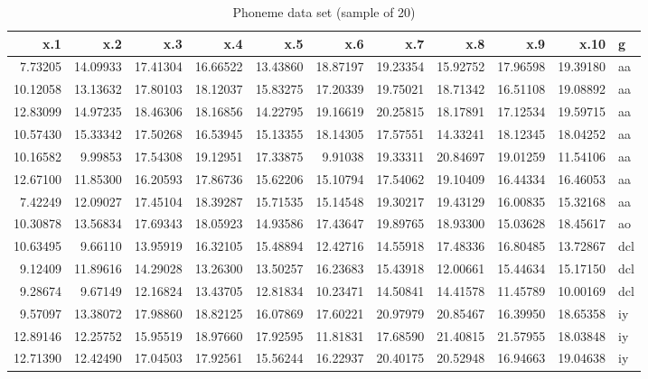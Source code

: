 \documentclass[
]{article}
\begin{document}
\begin{table}

\caption{\label{tab:unnamed-chunk-11}Phoneme data set (sample of 20)}
\centering
\begin{tabular}[t]{r|r|r|r|r|r|r|r|r|r|l}
\hline
x.1 & x.2 & x.3 & x.4 & x.5 & x.6 & x.7 & x.8 & x.9 & x.10 & g\\
\hline
7.73205 & 14.09933 & 17.41304 & 16.66522 & 13.43860 & 18.87197 & 19.23354 & 15.92752 & 17.96598 & 19.39180 & aa\\
\hline
10.12058 & 13.13632 & 17.80103 & 18.12037 & 15.83275 & 17.20339 & 19.75021 & 18.71342 & 16.51108 & 19.08892 & aa\\
\hline
12.83099 & 14.97235 & 18.46306 & 18.16856 & 14.22795 & 19.16619 & 20.25815 & 18.17891 & 17.12534 & 19.59715 & aa\\
\hline
10.57430 & 15.33342 & 17.50268 & 16.53945 & 15.13355 & 18.14305 & 17.57551 & 14.33241 & 18.12345 & 18.04252 & aa\\
\hline
10.16582 & 9.99853 & 17.54308 & 19.12951 & 17.33875 & 9.91038 & 19.33311 & 20.84697 & 19.01259 & 11.54106 & aa\\
\hline
12.67100 & 11.85300 & 16.20593 & 17.86736 & 15.62206 & 15.10794 & 17.54062 & 19.10409 & 16.44334 & 16.46053 & aa\\
\hline
7.42249 & 12.09027 & 17.45104 & 18.39287 & 15.71535 & 15.14548 & 19.30217 & 19.43129 & 16.00835 & 15.32168 & aa\\
\hline
10.30878 & 13.56834 & 17.69343 & 18.05923 & 14.93586 & 17.43647 & 19.89765 & 18.93300 & 15.03628 & 18.45617 & ao\\
\hline
10.63495 & 9.66110 & 13.95919 & 16.32105 & 15.48894 & 12.42716 & 14.55918 & 17.48336 & 16.80485 & 13.72867 & dcl\\
\hline
9.12409 & 11.89616 & 14.29028 & 13.26300 & 13.50257 & 16.23683 & 15.43918 & 12.00661 & 15.44634 & 15.17150 & dcl\\
\hline
9.28674 & 9.67149 & 12.16824 & 13.43705 & 12.81834 & 10.23471 & 14.50841 & 14.41578 & 11.45789 & 10.00169 & dcl\\
\hline
9.57097 & 13.38072 & 17.98860 & 18.82125 & 16.07869 & 17.60221 & 20.97979 & 20.85467 & 16.39950 & 18.65358 & iy\\
\hline
12.89146 & 12.25752 & 15.95519 & 18.97660 & 17.92595 & 11.81831 & 17.68590 & 21.40815 & 21.57955 & 18.03848 & iy\\
\hline
12.71390 & 12.42490 & 17.04503 & 17.92561 & 15.56244 & 16.22937 & 20.40175 & 20.52948 & 16.94663 & 19.04638 & iy\\

\end{tabular}
\end{table}
\end{document}
